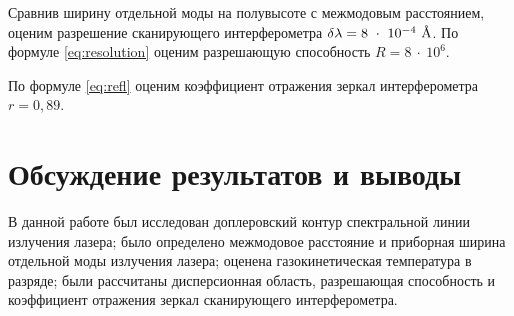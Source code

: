 \documentclass[a4paper, 12pt]{article}
\begin{document}
Сравнив ширину отдельной моды на полувысоте с межмодовым расстоянием, оценим разрешение сканирующего интерферометра $\delta{\lambda} = 8~\cdot~10^{-4}~\text{\r{A}}$.  По формуле \eqref{eq:resolution} оценим разрешающую способность $R = 8~\cdot~10^{6}$.

По формуле \eqref{eq:refl} оценим коэффициент отражения зеркал интерферометра $r = 0,89$.

\section{Обсуждение результатов и выводы}

В данной работе был исследован доплеровский контур спектральной линии излучения лазера; было определено межмодовое расстояние и приборная ширина отдельной моды излучения лазера; оценена газокинетическая температура в разряде; были рассчитаны дисперсионная область, разрешающая способность и коэффициент отражения зеркал сканирующего интерферометра.
\end{document}
